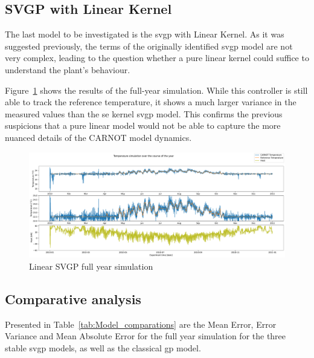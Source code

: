 \subsection{SVGP with Linear Kernel}\label{sec:svgp_linear}

The last model to be investigated is the \acrshort{svgp} with Linear Kernel. As
it was suggested previously, the terms of the originally identified
\acrshort{svgp} model are not very complex, leading to the question whether a
pure linear kernel could suffice to understand the plant's behaviour.

Figure~\ref{fig:SVGP_linear_fullyear_simulation} shows the results of the
full-year simulation. While this controller is still able to track the reference
temperature, it shows a much larger variance in the measured values than the
\acrshort{se} kernel \acrshort{svgp} model. This confirms the previous
suspicions that a pure linear model would not be able to capture the more
nuanced details of the CARNOT model dynamics.

\begin{figure}[ht]
    \centering
    \includegraphics[width =
    \textwidth]{Plots/10_SVGP_480pts_inf_window_12_averageYear_LinearKernel_fullyear.pdf}
    \caption{Linear SVGP full year simulation}
    \label{fig:SVGP_linear_fullyear_simulation}
\end{figure}

\clearpage

\subsection{Comparative analysis}

Presented in Table~\ref{tab:Model_comparations} are the Mean Error, Error
Variance and Mean Absolute Error for the full year simulation for the three
stable \acrshort{svgp} models, as well as the classical \acrshort{gp} model. 

